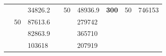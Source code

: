 \begin{table}[]
\begin{tabular}{|cclccllll}
\rowcolor[HTML]{DDFDFF} 
\multicolumn{1}{|c|}{\cellcolor[HTML]{FFFFC7}}                                & \multicolumn{1}{c|}{\cellcolor[HTML]{DDFDFF}}                      & \multicolumn{1}{l|}{\cellcolor[HTML]{DAE8FC}34826.2}   & \multicolumn{1}{c|}{\cellcolor[HTML]{FFFFC7}}                                & \multicolumn{1}{c|}{\multirow{-10}{*}{\cellcolor[HTML]{DDFDFF}50}}  & \multicolumn{1}{l|}{\cellcolor[HTML]{DDFDFF}48936.9}   & \multicolumn{1}{c|}{\multirow{-19}{*}{\cellcolor[HTML]{FFFFC7}\textbf{300}}} & \multicolumn{1}{c|}{\multirow{-10}{*}{\cellcolor[HTML]{DDFDFF}50}} & \multicolumn{1}{l|}{\cellcolor[HTML]{DDFDFF}746153}    \\ \cline{3-3} \cline{5-9} 
\multicolumn{1}{|c|}{\cellcolor[HTML]{FFFFC7}}                                & \multicolumn{1}{c|}{\multirow{-10}{*}{\cellcolor[HTML]{DDFDFF}50}} & \multicolumn{1}{l|}{\cellcolor[HTML]{DDFDFF}87613.6}   & \multicolumn{1}{c|}{\cellcolor[HTML]{FFFFC7}}                                & \multicolumn{1}{c|}{\cellcolor[HTML]{DAE8FC}}                       & \multicolumn{1}{l|}{\cellcolor[HTML]{DAE8FC}279742}    &                                                                              &                                                                    &                                                        \\ \cline{2-3} \cline{6-6}
\multicolumn{1}{|c|}{\cellcolor[HTML]{FFFFC7}}                                & \multicolumn{1}{c|}{\cellcolor[HTML]{DAE8FC}}                      & \multicolumn{1}{l|}{\cellcolor[HTML]{DAE8FC}82863.9}   & \multicolumn{1}{c|}{\cellcolor[HTML]{FFFFC7}}                                & \multicolumn{1}{c|}{\cellcolor[HTML]{DAE8FC}}                       & \multicolumn{1}{l|}{\cellcolor[HTML]{DDFDFF}365710}    &                                                                              &                                                                    &                                                        \\ \cline{3-3} \cline{6-6}
\multicolumn{1}{|c|}{\cellcolor[HTML]{FFFFC7}}                                & \multicolumn{1}{c|}{\cellcolor[HTML]{DAE8FC}}                      & \multicolumn{1}{l|}{\cellcolor[HTML]{DDFDFF}103618}    & \multicolumn{1}{c|}{\cellcolor[HTML]{FFFFC7}}                                & \multicolumn{1}{c|}{\cellcolor[HTML]{DAE8FC}}                       & \multicolumn{1}{l|}{\cellcolor[HTML]{DAE8FC}207919}    &                                                                              &                                                                    &                                                        \\ \cline{3-3} \cline{6-6}

\end{tabular}
\end{table}
